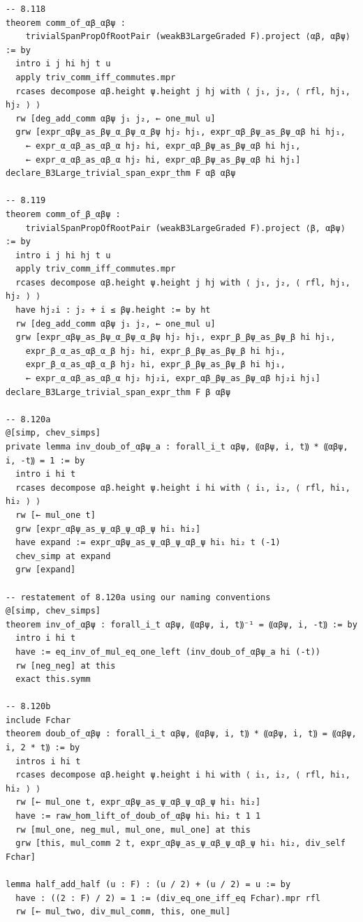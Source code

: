 \documentclass[10pt,a4paper]{article}
\begin{document}
\begin{Verbatim}
-- 8.118
theorem comm_of_αβ_αβψ :
    trivialSpanPropOfRootPair (weakB3LargeGraded F).project ⟨αβ, αβψ⟩ := by
  intro i j hi hj t u
  apply triv_comm_iff_commutes.mpr
  rcases decompose αβ.height ψ.height j hj with ⟨ j₁, j₂, ⟨ rfl, hj₁, hj₂ ⟩ ⟩
  rw [deg_add_comm αβψ j₁ j₂, ← one_mul u]
  grw [expr_αβψ_as_βψ_α_βψ_α_βψ hj₂ hj₁, expr_αβ_βψ_as_βψ_αβ hi hj₁,
    ← expr_α_αβ_as_αβ_α hj₂ hi, expr_αβ_βψ_as_βψ_αβ hi hj₁,
    ← expr_α_αβ_as_αβ_α hj₂ hi, expr_αβ_βψ_as_βψ_αβ hi hj₁]
declare_B3Large_trivial_span_expr_thm F αβ αβψ

-- 8.119
theorem comm_of_β_αβψ :
    trivialSpanPropOfRootPair (weakB3LargeGraded F).project ⟨β, αβψ⟩ := by
  intro i j hi hj t u
  apply triv_comm_iff_commutes.mpr
  rcases decompose αβ.height ψ.height j hj with ⟨ j₁, j₂, ⟨ rfl, hj₁, hj₂ ⟩ ⟩
  have hj₂i : j₂ + i ≤ βψ.height := by ht
  rw [deg_add_comm αβψ j₁ j₂, ← one_mul u]
  grw [expr_αβψ_as_βψ_α_βψ_α_βψ hj₂ hj₁, expr_β_βψ_as_βψ_β hi hj₁,
    expr_β_α_as_αβ_α_β hj₂ hi, expr_β_βψ_as_βψ_β hi hj₁,
    expr_β_α_as_αβ_α_β hj₂ hi, expr_β_βψ_as_βψ_β hi hj₁,
    ← expr_α_αβ_as_αβ_α hj₂ hj₂i, expr_αβ_βψ_as_βψ_αβ hj₂i hj₁]
declare_B3Large_trivial_span_expr_thm F β αβψ

-- 8.120a
@[simp, chev_simps]
private lemma inv_doub_of_αβψ_a : forall_i_t αβψ, ⸨αβψ, i, t⸩ * ⸨αβψ, i, -t⸩ = 1 := by
  intro i hi t
  rcases decompose αβ.height ψ.height i hi with ⟨ i₁, i₂, ⟨ rfl, hi₁, hi₂ ⟩ ⟩
  rw [← mul_one t]
  grw [expr_αβψ_as_ψ_αβ_ψ_αβ_ψ hi₁ hi₂]
  have expand := expr_αβψ_as_ψ_αβ_ψ_αβ_ψ hi₁ hi₂ t (-1)
  chev_simp at expand
  grw [expand]

-- restatement of 8.120a using our naming conventions
@[simp, chev_simps]
theorem inv_of_αβψ : forall_i_t αβψ, ⸨αβψ, i, t⸩⁻¹ = ⸨αβψ, i, -t⸩ := by
  intro i hi t
  have := eq_inv_of_mul_eq_one_left (inv_doub_of_αβψ_a hi (-t))
  rw [neg_neg] at this
  exact this.symm

-- 8.120b
include Fchar
theorem doub_of_αβψ : forall_i_t αβψ, ⸨αβψ, i, t⸩ * ⸨αβψ, i, t⸩ = ⸨αβψ, i, 2 * t⸩ := by
  intros i hi t
  rcases decompose αβ.height ψ.height i hi with ⟨ i₁, i₂, ⟨ rfl, hi₁, hi₂ ⟩ ⟩
  rw [← mul_one t, expr_αβψ_as_ψ_αβ_ψ_αβ_ψ hi₁ hi₂]
  have := raw_hom_lift_of_doub_of_αβψ hi₁ hi₂ t 1 1
  rw [mul_one, neg_mul, mul_one, mul_one] at this
  grw [this, mul_comm 2 t, expr_αβψ_as_ψ_αβ_ψ_αβ_ψ hi₁ hi₂, div_self Fchar]

lemma half_add_half (u : F) : (u / 2) + (u / 2) = u := by
  have : ((2 : F) / 2) = 1 := (div_eq_one_iff_eq Fchar).mpr rfl
  rw [← mul_two, div_mul_comm, this, one_mul]


\end{Verbatim}
\end{document}
